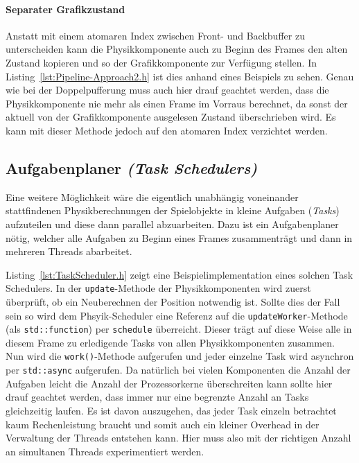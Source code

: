 \documentclass[12pt, a4paper, titlepage, hidelinks]{scrreprt}
\begin{document}

\paragraph{Separater Grafikzustand}

Anstatt mit einem atomaren Index zwischen Front- und Backbuffer zu unterscheiden kann die Physikkomponente auch zu Beginn des Frames den alten Zustand kopieren und so der Grafikkomponente zur Verfügung stellen. In Listing~\autoref{lst:Pipeline-Approach2.h} ist dies anhand eines Beispiels zu sehen. Genau wie bei der Doppelpufferung muss auch hier drauf geachtet werden, dass die Physikkomponente nie mehr als einen Frame im Vorraus berechnet, da sonst der aktuell von der Grafikkomponente ausgelesen Zustand überschrieben wird. Es kann mit dieser Methode jedoch auf den atomaren Index verzichtet werden.


\subsection{Aufgabenplaner \textit{(Task Schedulers)}}

Eine weitere Möglichkeit wäre die eigentlich unabhängig voneinander stattfindenen Physikberechnungen der Spielobjekte in kleine Aufgaben (\textit{Tasks}) aufzuteilen und diese dann parallel abzuarbeiten. Dazu ist ein Aufgabenplaner  nötig, welcher alle Aufgaben zu Beginn eines Frames zusammenträgt und dann in mehreren Threads abarbeitet.

Listing~\autoref{lst:TaskScheduler.h} zeigt eine Beispielimplementation eines solchen Task Schedulers. In der \texttt{update}-Methode der Physikkomponenten wird zuerst überprüft, ob ein Neuberechnen der Position notwendig ist. Sollte dies der Fall sein so wird dem Phsyik-Scheduler eine Referenz auf die \texttt{updateWorker}-Methode (als \texttt{std::function}) per \texttt{schedule} überreicht. Dieser trägt auf diese Weise alle in diesem Frame zu erledigende Tasks von allen Physikkomponenten zusammen. Nun wird die \texttt{work()}-Methode aufgerufen und jeder einzelne Task wird asynchron per \texttt{std::async} aufgerufen. Da natürlich bei vielen Komponenten die Anzahl der Aufgaben leicht die Anzahl der Prozessorkerne überschreiten kann sollte hier drauf geachtet werden, dass immer nur eine begrenzte Anzahl an Tasks gleichzeitig laufen. Es ist davon auszugehen, das jeder Task einzeln betrachtet kaum Rechenleistung braucht und somit auch ein kleiner Overhead in der Verwaltung der Threads entstehen kann. Hier muss also mit der richtigen Anzahl an simultanen Threads experimentiert werden.
\end{document}
